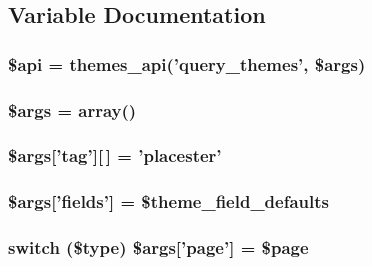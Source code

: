 \subsection{Variable Documentation}
\hypertarget{themes__results_8php_afce321e6f53c241037f871b50680cf1c}{
\subsubsection[{\$api}]{\setlength{\rightskip}{0pt plus 5cm}\$api = themes\_\-api('query\_\-themes', \$args)}}
\label{dc/dd5/themes__results_8php_afce321e6f53c241037f871b50680cf1c}
\hypertarget{themes__results_8php_a67e94494731d99ed23b123e95175bc10}{
\subsubsection[{\$args}]{\setlength{\rightskip}{0pt plus 5cm}\$args = array()}}
\label{dc/dd5/themes__results_8php_a67e94494731d99ed23b123e95175bc10}
\hypertarget{themes__results_8php_a909c74da5d237da8bbb1d99d2e57d7c5}{
\subsubsection[{\$args}]{\setlength{\rightskip}{0pt plus 5cm}\$args\mbox{[}'tag'\mbox{]}\mbox{[}$\,$\mbox{]} = 'placester'}}
\label{dc/dd5/themes__results_8php_a909c74da5d237da8bbb1d99d2e57d7c5}
\hypertarget{themes__results_8php_a1bb6ae92685ad0df0e3e1848a3b0719c}{
\subsubsection[{\$args}]{\setlength{\rightskip}{0pt plus 5cm}\$args\mbox{[}'fields'\mbox{]} = \$theme\_\-field\_\-defaults}}
\label{dc/dd5/themes__results_8php_a1bb6ae92685ad0df0e3e1848a3b0719c}
\hypertarget{themes__results_8php_a0f69f43fc8498682cb8f6d9b8f62f1b5}{
\subsubsection[{\$args}]{\setlength{\rightskip}{0pt plus 5cm}switch (\$type) \$args\mbox{[}'page'\mbox{]} = \$page}}
